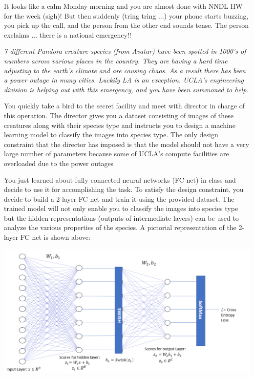 \documentclass{article}
\begin{document}
It looks like a calm Monday morning and you are almost done with NNDL HW for the week (sigh)! But then suddenly (tring tring ...) your phone starts buzzing, you pick up the call, and the person from the other end sounds tense. The person exclaims ... there is a national emergency!!

\textit{7 different Pandora creature species (from Avatar) have been spotted in 1000’s of numbers
across various places in the country. They are having a hard time adjusting to the earth’s
climate and are causing chaos. As a result there has been a power outage in many cities.
Luckily LA is an exception. UCLA’s engineering division is helping out with this emergency,
and you have been summoned to help.}

You quickly take a bird to the secret facility and meet with director in charge of this operation. The director gives you a dataset consisting of images of these creatures along with
their species type and instructs you to design a machine learning model to classify the images into species type. The only design constraint that the director has imposed is that the
model should not have a very large number of parameters because some of UCLA’s compute
facilities are overloaded due to the power outages

You just learned about fully connected neural networks (FC net) in class and decide to use it
for accomplishing the task. To satisfy the design constraint, you decide to build a 2-layer FC
net and train it using the provided dataset. The trained model will not only enable you to
classify the images into species type but the hidden representations (outputs of intermediate
layers) can be used to analyze the various properties of the species. A pictorial representation
of the 2-layer FC net is shown above:

\begin{center}
    \includegraphics[scale=0.6]{hwk3_q3_img.png}
\end{center}
\end{document}
